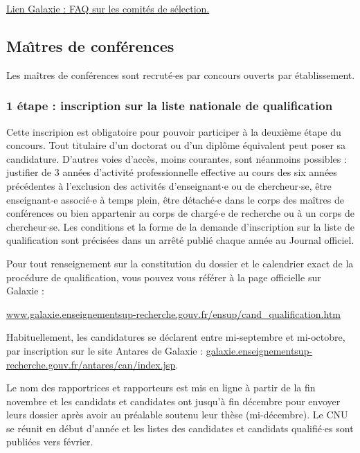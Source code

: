 \href{https://www.galaxie.enseignementsup-recherche.gouv.fr/ensup/etab_FAQ_comites_selection.html}{Lien Galaxie : FAQ sur les comit\'es de s\'election.}


\subsection{Ma\^\i tres de conf\'erences}

Les ma\^itres de conf\'erences sont recrut\'e$\cdot$es par concours ouverts par \'etablissement.

\subsubsection*{1\iere{} \'etape : inscription sur la liste nationale de qualification}

Cette inscripion est obligatoire pour pouvoir participer \`a la
deuxi\`eme \'etape du concours. Tout titulaire d'un doctorat ou d'un
dipl\^ome \'equivalent peut poser sa candidature. D'autres voies
d'acc\`es, moins courantes, sont n\'eanmoins possibles : justifier de
3 ann\'ees d'activit\'e professionnelle effective au cours des six
ann\'ees pr\'ec\'edentes \`a l'exclusion des activit\'es
d'enseignant$\cdot$e ou de chercheur$\cdot$se, \^etre enseignant$\cdot$e associ\'e$\cdot$e \`a temps
plein, \^etre d\'etach\'e$\cdot$e dans le corps des ma\^itres de
conf\'erences ou bien appartenir au corps de charg\'e$\cdot$e de recherche
ou \`a un corps de chercheur$\cdot$se. Les conditions et la forme de la
demande d'inscription sur la liste de qualification sont
pr\'ecis\'ees dans un arr\^et\'e publi\'e chaque ann\'ee au Journal
officiel.

Pour tout renseignement sur la constitution du dossier et le calendrier exact de la proc\'edure de qualification, 
vous pouvez vous r\'ef\'erer \`a la page officielle sur Galaxie :

{\url{www.galaxie.enseignementsup-recherche.gouv.fr/ensup/cand\_qualification.htm}}

Habituellement, les candidatures se d\'eclarent entre mi-septembre et mi-octobre, 
par inscription sur le site Antares de Galaxie : \url{galaxie.enseignementsup-recherche.gouv.fr/antares/can/index.jsp}.

Le nom des rapportrices et rapporteurs est mis en ligne \`a partir de la fin novembre et 
les candidats et candidates ont jusqu'\`a fin d\'ecembre pour envoyer leurs dossier apr\`es avoir au pr\'ealable soutenu
leur th\`ese (mi-d\'ecembre).
Le CNU se r\'eunit en d\'ebut d'ann\'ee et les listes des candidates et candidats qualifi\'e$\cdot$es sont publi\'ees vers f\'evrier.

